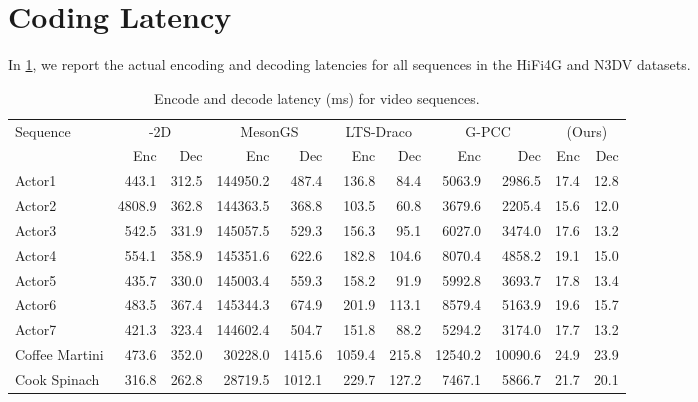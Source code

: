 \appendix
\renewcommand\thefigure{A.\arabic{figure}}
\renewcommand\thesection{\Alph{section}}
\renewcommand{\thealgocf}{A.\arabic{algocf}}
\renewcommand\thetable{A.\arabic{table}}
\setcounter{section}{0}
\setcounter{algocf}{0}
\setcounter{figure}{0}
\setcounter{table}{0}

\section{Coding Latency}\label{app:coding-latency}

In \cref{tab:latency_per_sequence}, we report the actual encoding and decoding latencies for all sequences in the HiFi4G and N3DV datasets.

\begin{table}[t]
  \centering
  \footnotesize
  \caption{Encode and decode latency (ms) for video sequences.}
  \label{tab:latency_per_sequence}
  \begin{tabular}{lrrrrrrrrrr}
  \toprule
  Sequence & \multicolumn{2}{c}{\vthree{}-2D} & \multicolumn{2}{c}{MesonGS} & \multicolumn{2}{c}{LTS-Draco} & \multicolumn{2}{c}{G-PCC} & \multicolumn{2}{c}{\gsnfs{} (Ours)} \\
           & Enc & Dec & Enc & Dec & Enc & Dec & Enc & Dec & Enc & Dec \\
  \hline
  Actor1    & 443.1  & 312.5 & 144950.2 & 487.4 & 136.8  & 84.4  & 5063.9  & 2986.5  & 17.4 & 12.8 \\
  Actor2    & 4808.9 & 362.8 & 144363.5 & 368.8 & 103.5  & 60.8  & 3679.6  & 2205.4  & 15.6 & 12.0 \\
  Actor3    & 542.5  & 331.9 & 145057.5 & 529.3 & 156.3  & 95.1  & 6027.0  & 3474.0  & 17.6 & 13.2 \\
  Actor4    & 554.1  & 358.9 & 145351.6 & 622.6 & 182.8  & 104.6 & 8070.4  & 4858.2  & 19.1 & 15.0 \\
  Actor5    & 435.7  & 330.0 & 145003.4 & 559.3 & 158.2  & 91.9  & 5992.8  & 3693.7  & 17.8 & 13.4 \\
  Actor6    & 483.5  & 367.4 & 145344.3 & 674.9 & 201.9  & 113.1 & 8579.4  & 5163.9  & 19.6 & 15.7 \\
  Actor7    & 421.3  & 323.4 & 144602.4 & 504.7 & 151.8  & 88.2  & 5294.2  & 3174.0  & 17.7 & 13.2 \\
  \midrule
  Coffee Martini   & 473.6 & 352.0 & 30228.0 & 1415.6 & 1059.4 & 215.8 & 12540.2 & 10090.6 & 24.9 & 23.9 \\
  Cook Spinach     & 316.8 & 262.8 & 28719.5 & 1012.1 & 229.7  & 127.2 & 7467.1  & 5866.7  & 21.7 & 20.1 \\

\end{tabular}
\end{table}
